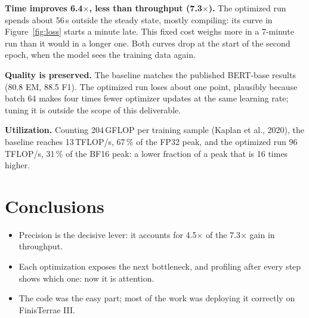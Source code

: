 \documentclass[10pt,a4paper,twocolumn]{article}
\newcommand{\x}{$\times$}
\begin{document}
\textbf{Time improves 6.4\x{}, less than throughput (7.3\x).} The optimized run spends about
56\,s outside the steady state, mostly compiling: its curve in Figure~\ref{fig:loss} starts a
minute late. This fixed cost weighs more in a 7-minute run than it would in a longer one. Both
curves drop at the start of the second epoch, when the model sees the training data again.

\textbf{Quality is preserved.} The baseline matches the published BERT-base results (80.8 EM,
88.5 F1). The optimized run loses about one point, plausibly because batch 64 makes four times
fewer optimizer updates at the same learning rate; tuning it is outside the scope of this
deliverable.

\textbf{Utilization.} Counting 204\,GFLOP per training sample (Kaplan et al., 2020), the baseline
reaches 13\,TFLOP/s, 67\,\% of the FP32 peak, and the optimized run 96\,TFLOP/s, 31\,\% of the
BF16 peak: a lower fraction of a peak that is 16 times higher.

\section{Conclusions}

\begin{itemize}
  \item Precision is the decisive lever: it accounts for 4.5\x{} of the 7.3\x{} gain in
        throughput.
  \item Each optimization exposes the next bottleneck, and profiling after every step shows
        which one: now it is attention.
  \item The code was the easy part; most of the work was deploying it correctly on
        FinisTerrae III.
\end{itemize}
\end{document}
